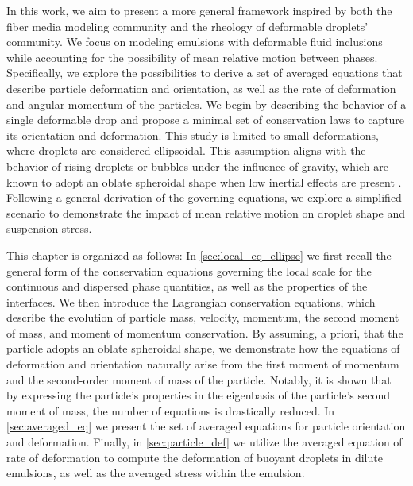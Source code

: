 In this work, we aim to present a more general framework inspired by both the fiber media modeling community and the rheology of deformable droplets' community. 
We focus on modeling emulsions with deformable fluid inclusions while accounting for the possibility of mean relative motion between phases. 
Specifically, we explore the possibilities to derive a set of averaged equations that describe particle deformation and orientation, as well as the rate of deformation and angular momentum of the particles.
We begin by describing the behavior of a single deformable drop and propose a minimal set of conservation laws to capture its orientation and deformation. 
This study is limited to small deformations, where droplets are considered ellipsoidal. 
This assumption aligns with the behavior of rising droplets or bubbles under the influence of gravity, which are known to adopt an oblate spheroidal shape when low inertial effects are present \citep{taylor1964deformation}. 
Following a general derivation of the governing equations, we explore a simplified scenario to demonstrate the impact of mean relative motion on droplet shape and suspension stress.

This chapter is organized as follows:
In \ref{sec:local_eq_ellipse} we first recall the general form of the conservation equations governing the local scale for the continuous and dispersed phase quantities, as well as the properties of the interfaces. 
We then introduce the Lagrangian conservation equations, which describe the evolution of particle mass, velocity, momentum, the second moment of mass, and moment of momentum conservation. 
By assuming, a priori, that the particle adopts an oblate spheroidal shape, we demonstrate how the equations of deformation and orientation naturally arise from the first moment of momentum and the second-order moment of mass of the particle.
Notably, it is shown that by expressing the particle's properties in the eigenbasis of the particle's second moment of mass, the number of equations is drastically reduced.
In \ref{sec:averaged_eq} we present the set of averaged equations for particle orientation and deformation. 
Finally, in \ref{sec:particle_def} we utilize the averaged equation of rate of deformation to compute the deformation of buoyant droplets in dilute emulsions, as well as the averaged stress within the emulsion. 

